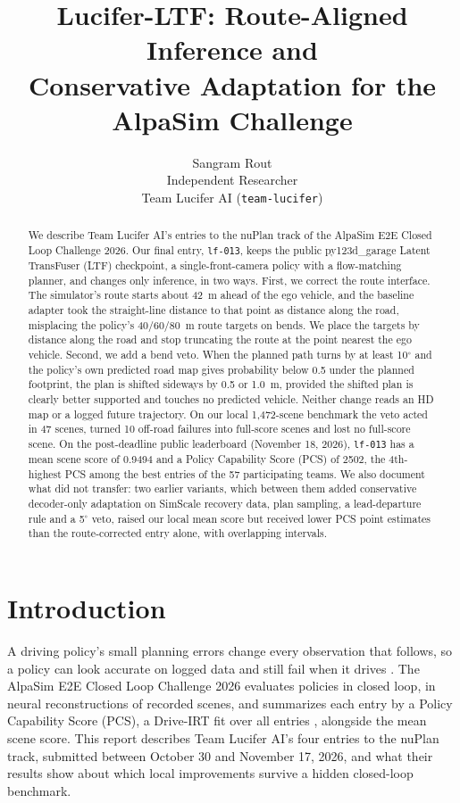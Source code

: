 \documentclass{article}
\title{Lucifer-LTF: Route-Aligned Inference and\protect\\Conservative Adaptation for the AlpaSim Challenge}
\author{Sangram Rout\\Independent Researcher\\Team Lucifer AI (\texttt{team-lucifer})}
\date{}
\begin{document}
\maketitle
\begin{abstract}
We describe Team Lucifer AI's entries to the nuPlan track of the AlpaSim E2E Closed Loop Challenge 2026. Our final entry, \texttt{lf-013}, keeps the public py123d\_garage Latent TransFuser (LTF) checkpoint, a single-front-camera policy with a flow-matching planner, and changes only inference, in two ways. First, we correct the route interface. The simulator's route starts about 42~m ahead of the ego vehicle, and the baseline adapter took the straight-line distance to that point as distance along the road, misplacing the policy's 40/60/80~m route targets on bends. We place the targets by distance along the road and stop truncating the route at the point nearest the ego vehicle. Second, we add a bend veto. When the planned path turns by at least 10$^\circ$ and the policy's own predicted road map gives probability below 0.5 under the planned footprint, the plan is shifted sideways by 0.5 or 1.0~m, provided the shifted plan is clearly better supported and touches no predicted vehicle. Neither change reads an HD map or a logged future trajectory. On our local 1,472-scene benchmark the veto acted in 47 scenes, turned 10 off-road failures into full-score scenes and lost no full-score scene. On the post-deadline public leaderboard (November 18, 2026), \texttt{lf-013} has a mean scene score of 0.9494 and a Policy Capability Score (PCS) of 2502, the 4th-highest PCS among the best entries of the 57 participating teams. We also document what did not transfer: two earlier variants, which between them added conservative decoder-only adaptation on SimScale recovery data, plan sampling, a lead-departure rule and a 5$^\circ$ veto, raised our local mean score but received lower PCS point estimates than the route-corrected entry alone, with overlapping intervals.
\end{abstract}

\section{Introduction}
A driving policy's small planning errors change every observation that follows, so a policy can look accurate on logged data and still fail when it drives \cite{pdm}. The AlpaSim E2E Closed Loop Challenge 2026 \cite{alpasim,board} evaluates policies in closed loop, in neural reconstructions of recorded scenes, and summarizes each entry by a Policy Capability Score (PCS), a Drive-IRT fit over all entries \cite{driveirt}, alongside the mean scene score. This report describes Team Lucifer AI's four entries to the nuPlan track, submitted between October 30 and November 17, 2026, and what their results show about which local improvements survive a hidden closed-loop benchmark.
\end{document}
